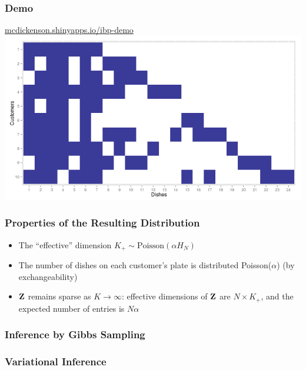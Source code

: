 \documentclass[13pt]{beamer}
\begin{document}
\begin{frame}
\frametitle{Demo}

\begin{center}
\href{http://mcdickenson.shinyapps.io/ibp-demo}{mcdickenson.shinyapps.io/ibp-demo}
\includegraphics[scale=0.4]{./img/ibp-shiny-demo.png}
\end{center}

\end{frame}
\begin{frame}
\frametitle{Properties of the Resulting Distribution}
\begin{itemize}
\item The ``effective'' dimension $K_+ \sim \text{Poisson}(\alpha H_N)$
\item The number of dishes on each customer's plate is distributed Poisson($\alpha$) (by exchangeability)
\item $\bf{Z}$ remains sparse as $K\rightarrow \infty$: effective dimensions of $\bf{Z}$ are $N \times K_+$, and the expected number of entries is $N\alpha$
\end{itemize}

\end{frame}
\begin{frame}
\frametitle{Inference by Gibbs Sampling}
\end{frame}
\begin{frame}
\frametitle{Variational Inference}
\end{frame}
\end{document}
